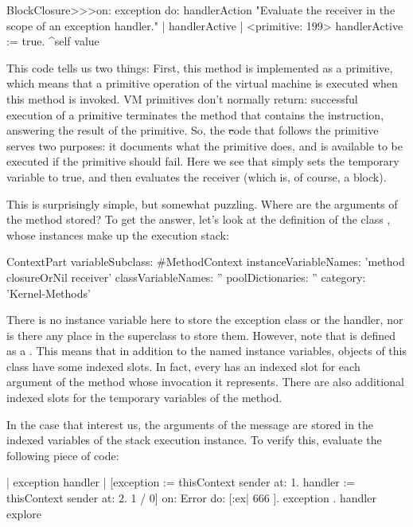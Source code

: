 \documentclass[a4paper,10pt,twoside]{book}
\begin{document}
\begin{code}{}
BlockClosure>>>on: exception do: handlerAction 
	"Evaluate the receiver in the scope of an exception handler." 
	| handlerActive | 
	<primitive: 199> 
	handlerActive := true. 
	^self value 
\end{code}

This code tells us two things: First, this method is implemented as a primitive, which means that  a primitive operation of the virtual machine is executed when this method is invoked.  VM primitives don't normally return: successful execution of a primitive terminates the method that contains the  instruction, answering the result of the primitive.
So, the \st code that follows the primitive serves two purposes: it documents what the primitive does, and is available to be executed if the primitive should fail. 
Here we see that  simply sets the temporary variable  to true, and then evaluates the receiver (which is, of course, a block).  

This is surprisingly simple, but somewhat puzzling.  Where are the arguments of the  method stored?
To get the answer,  let's look at the definition of the class , whose instances make up the execution stack: 

\begin{code}{}
ContextPart variableSubclass: #MethodContext
	instanceVariableNames: 'method closureOrNil receiver'
	classVariableNames: ''
	poolDictionaries: ''
	category: 'Kernel-Methods'
\end{code}

There is no instance variable here to store the exception class or the handler, nor is there any place in the superclass to store them. 
However, note that  is defined as a .
This means that in addition to the named instance variables, objects of this class have some indexed slots.  In fact, every  has an indexed slot for each argument of the method whose invocation it represents.  There are also additional indexed slots for the temporary variables of the method.

In the case that interest us, the arguments of the  message are stored in the indexed variables of the stack execution instance. To verify this, evaluate the following piece of code:

\begin{code}{}
| exception handler | 
[exception := thisContext sender at: 1. 
handler := thisContext sender at: 2. 
1 / 0] 
   on: Error 
   do: [:ex| 666 ]. 
{ exception . handler } explore
\end{code}
\end{document}
